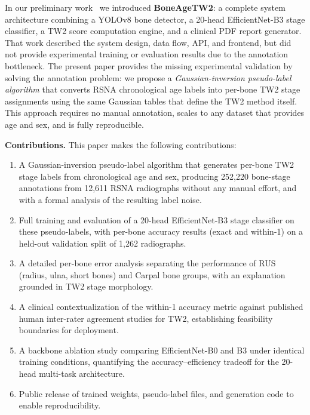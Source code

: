 \documentclass[journal]{IEEEtran}
\begin{document}
In our preliminary work~\cite{castillo2026boneagetw2} we introduced
\textbf{BoneAgeTW2}: a complete system architecture combining a
YOLOv8 bone detector, a 20-head EfficientNet-B3 stage classifier,
a TW2 score computation engine, and a clinical PDF report generator.
That work described the system design, data flow, API, and frontend,
but did not provide experimental training or evaluation results due
to the annotation bottleneck.
The present paper provides the missing experimental validation by
solving the annotation problem: we propose a
\textit{Gaussian-inversion pseudo-label algorithm} that converts
RSNA chronological age labels into per-bone TW2 stage assignments
using the same Gaussian tables that define the TW2 method itself.
This approach requires no manual annotation, scales to any
dataset that provides age and sex, and is fully reproducible.

\textbf{Contributions.} This paper makes the following contributions:
\begin{enumerate}
  \item A Gaussian-inversion pseudo-label algorithm that generates
        per-bone TW2 stage labels from chronological age and sex,
        producing 252,220 bone-stage annotations from 12,611 RSNA
        radiographs without any manual effort, and with a formal
        analysis of the resulting label noise.
  \item Full training and evaluation of a 20-head EfficientNet-B3
        stage classifier on these pseudo-labels, with per-bone
        accuracy results (exact and within-1) on a held-out
        validation split of 1,262 radiographs.
  \item A detailed per-bone error analysis separating the
        performance of RUS (radius, ulna, short bones) and Carpal
        bone groups, with an explanation grounded in TW2 stage
        morphology.
  \item A clinical contextualization of the within-1 accuracy
        metric against published human inter-rater agreement
        studies for TW2, establishing feasibility boundaries
        for deployment.
  \item A backbone ablation study comparing EfficientNet-B0 and B3
        under identical training conditions, quantifying the
        accuracy--efficiency tradeoff for the 20-head multi-task
        architecture.
  \item Public release of trained weights, pseudo-label files,
        and generation code to enable reproducibility.
\end{enumerate}
\end{document}

